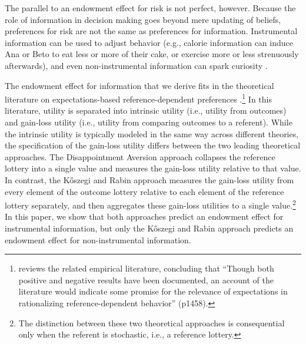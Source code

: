 \documentclass[12pt]{article}
\begin{document}
The parallel to an endowment effect for risk is not perfect, however. Because the role of information in decision making goes beyond mere updating of beliefs, preferences for risk are not the same as preferences for information. Instrumental information can be used to adjust behavior (e.g., calorie information can induce Ana or Beto to eat less or more of their cake, or exercise more or less strenuously afterwards), and even non-instrumental information can spark curiosity \citep{loewensteinPsychologyCuriosityReview1994,sharotHowPeopleDecide2020}.

The endowment effect for information that we derive fits in the theoretical literature on expectations-based reference-dependent preferences \citep{marzilliericsonEndowmentEffect2014,odonoghueChapterReferenceDependentPreferences2018}.\footnote{\citet{sprengerEndowmentEffectRisk2015} reviews the related empirical literature, concluding that \enquote{Though both positive and negative results have been documented, an account of the literature would indicate some promise for the relevance of expectations in rationalizing reference-dependent behavior} (p1458).} In this literature, utility is separated into intrinsic utility (i.e., utility from outcomes) and gain-loss utility (i.e., utility from comparing outcomes to a referent). While the intrinsic utility is typically modeled in the same way across different theories, the specification of the gain-loss utility differs between the two leading theoretical approaches. The Disappointment Aversion approach \citep{bellDisappointmentDecisionMaking1985,loomesDisappointmentDynamicConsistency1986,gulTheoryDisappointmentAversion1991} collapses the reference lottery into a single value and measures the gain-loss utility relative to that value. In contrast, the  Kőszegi and Rabin approach \citep{koszegiModelReferenceDependentPreferences2006,koszegiReferenceDependentRiskAttitudes2007} measures the gain-loss utility from every element of the outcome lottery relative to each element of the reference lottery separately, and then aggregates these gain-loss utilities to a single value.\footnote{The distinction between these two theoretical approaches is consequential only when the referent is stochastic, i.e., a reference lottery.}  In this paper, we show that both approaches predict an endowment effect for instrumental information, but only the Kőszegi and Rabin approach predicts an endowment effect for non-instrumental information.
\end{document}
